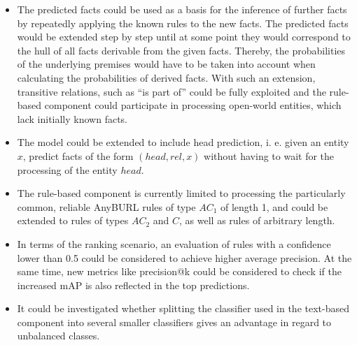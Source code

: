 \begin{itemize}
    \item The predicted facts could be used as a basis for the inference of further facts by repeatedly applying the known rules to the new facts. The predicted facts would be extended step by step until at some point they would correspond to the hull of all facts derivable from the given facts. Thereby, the probabilities of the underlying premises would have to be taken into account when calculating the probabilities of derived facts. With such an extension, transitive relations, such as ``is part of'' could be fully exploited and the rule-based component could participate in processing open-world entities, which lack initially known facts.

    \item The model could be extended to include head prediction, i. e. given an entity $x$, predict facts of the form $(head, rel, x)$ without having to wait for the processing of the entity $head$.

    \item The rule-based component is currently limited to processing the particularly common, reliable AnyBURL rules of type $AC_1$ of length 1, and could be extended to rules of types $AC_2$ and $C$, as well as rules of arbitrary length.

    \item In terms of the ranking scenario, an evaluation of rules with a confidence lower than 0.5 could be considered to achieve higher average precision. At the same time, new metrics like precision@k could be considered to check if the increased mAP is also reflected in the top predictions.

    \item It could be investigated whether splitting the classifier used in the text-based component into several smaller classifiers gives an advantage in regard to unbalanced classes.
\end{itemize}
